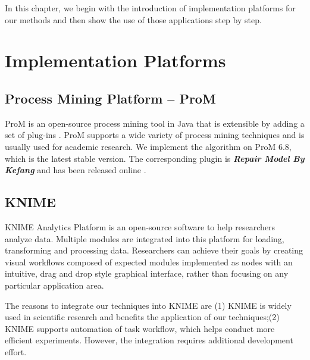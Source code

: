 In this chapter, we begin with the introduction of implementation platforms for our methods and then show the use of those applications step by step.

\section{Implementation Platforms}
\subsection{Process Mining Platform -- ProM}
ProM is an open-source process mining tool in Java that is extensible by adding a set of plug-ins \cite{ProM}. ProM supports a wide variety of process mining techniques and is usually used for academic research. We implement the algorithm on ProM 6.8, which is the latest stable version. The corresponding plugin is \textbf{\emph{Repair Model By Kefang}} and has been released online \cite{MyPlugin}.

\subsection{KNIME}
KNIME Analytics Platform is an open-source software to help researchers analyze data. Multiple modules are integrated into this platform for loading, transforming and processing data. Researchers can achieve their goals by creating visual workflows composed of expected modules implemented as nodes with an intuitive, drag and drop style graphical interface, rather than focusing on any particular application area.

The reasons to integrate our techniques into KNIME are (1) KNIME is widely used in scientific research and benefits the application of our techniques;(2) KNIME supports automation of task workflow, which helps conduct more efficient experiments.  However, the integration requires additional development effort.
